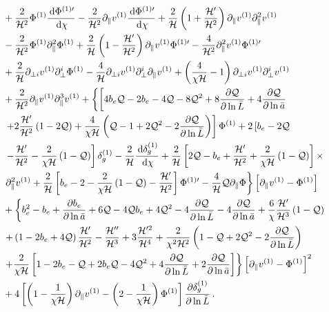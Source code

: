 \begin{align}
& + \frac{2}{\mathcal{H}^2} \Phi^{(1)} \frac{\,\mathrm{d} \Phi^{{(1)}\prime} }{\,\mathrm{d} \chi} - \frac{2}{\mathcal{H}^2} \partial_\| v^{(1)} \frac{\,\mathrm{d} \Phi^{{(1)} \prime} }{\,\mathrm{d} \chi} + \frac{2}{\mathcal{H}} \left(1 +\frac{\mathcal{H}'}{\mathcal{H}^2} \right) \partial_\| v^{(1)} \partial_\|^2 v^{(1)} \nonumber \\
& - \frac{2}{\mathcal{H}^2} \Phi^{(1)} \partial_\|^2 \Phi^{(1)} +\frac{2}{\mathcal{H}} \left(1 - \frac{\mathcal{H}'}{\mathcal{H}^2} \right) \partial_\| v^{(1)}\Phi^{(1)\prime} - \frac{4}{\mathcal{H}^2} \partial_\|^2 v^{(1)} \Phi^{(1)\prime} \nonumber \\
& + \frac{2}{\mathcal{H}} \partial_{\perp i} v^{(1)} \partial^i_\perp \Phi^{(1)} -\frac{{4}}{\mathcal{H}} \partial_{\perp i} v^{(1)} \partial_{\perp}^i \partial_\| v^{(1)} + \left(\frac{4}{ \chi \mathcal{H} } -1 \right) \partial_{\perp i} v^{(1)} \partial_{\perp}^i v^{(1)} \nonumber \\
& + \frac{2}{\mathcal{H}^2} \partial_\| v^{(1)} \partial_\|^3 v^{(1)} + \left\{ \left[ 4 b_e \mathcal{Q} - 2 b_e - 4 \mathcal{Q} - 8 \mathcal{Q}^2 + 8 \frac{\partial \mathcal{Q}}{\partial \ln \bar L} + 4 \frac{\partial \mathcal{Q}}{\partial \ln \bar a} \right. \right. \nonumber \\
&\left. \left. + 2  \frac{\mathcal{H}'}{\mathcal{H}^2} \left(1 - {2\mathcal{Q}}\right)  + \frac{4}{\chi \mathcal{H}} \left(\mathcal{Q} - 1 + 2 \mathcal{Q}^2 - 2 \frac{\partial \mathcal{Q}}{\partial \ln \bar L} \right) \right] \Phi^{(1)} + 2 \left[ b_e - 2\mathcal{Q} \right. \right. \nonumber \\
& \left. \left. -  \frac{\mathcal{H}'}{\mathcal{H}^2}  - \frac{2}{\chi \mathcal{H}} \left(1 - \mathcal{Q}\right)  \right] \delta_g^{(1)} - \frac{2}{\mathcal{H}} \frac{\,\mathrm{d} \delta_g^{(1)} }{\,\mathrm{d} \chi} + \frac{2}{\mathcal{H}} \left[ 2 \mathcal{Q} - b_e + \frac{\mathcal{H}'}{\mathcal{H}^2} + \frac{2}{\chi \mathcal{H}} \left(1 - \mathcal{Q}\right) \right]\times \right. \nonumber \\
&\left. \partial_\|^2 v^{(1)} + \frac{2}{\mathcal{H}} \left[ b_e - 2 - \frac{2}{\chi \mathcal{H}} \left(1 - \mathcal{Q} \right) - \frac{\mathcal{H}'}{\mathcal{H}^2} \right]  \Phi^{(1)\prime} - \frac{4}{\mathcal{H}} \mathcal{Q} \partial_\| \Phi \right\} \left[\partial_\| v^{(1)}- \Phi^{(1)} \right] \nonumber \\
& + \left\{ b_e^2 - b_e + \frac{\partial b_e}{\partial \ln \bar a} +6 \mathcal{Q} -4 \mathcal{Q} b_e + 4 \mathcal{Q}^2 - 4\frac{\partial \mathcal{Q}}{\partial \ln \bar L} - 4 \frac{\partial \mathcal{Q}}{\partial \ln \bar a} + \frac{6}{\chi} \frac{\mathcal{H}'}{\mathcal{H}^3} \left(1 - \mathcal{Q}\right) \right. \nonumber \\
& \left. + \left(1 - 2 b_e + 4\mathcal{Q} \right) \frac{\mathcal{H}' }{\mathcal{H}^2}  -\frac{\mathcal{H}'' }{\mathcal{H}^3} +3 \frac{\mathcal{H}^{\prime 2} }{\mathcal{H}^4} +  \frac{2}{\chi^2 \mathcal{H}^2} \left( 1 - \mathcal{Q} + 2 \mathcal{Q}^2 - 2 \frac{\partial \mathcal{Q}}{\partial \ln \bar L} \right) \right. \nonumber \\
& \left. + \frac{2}{\chi \mathcal{H}} \left[ 1 - 2 b_e - \mathcal{Q} + 2 b_e \mathcal{Q}  - 4 \mathcal{Q}^2 + 4 \frac{\partial \mathcal{Q}}{\partial \ln \bar L} + 2 \frac{\partial \mathcal{Q}}{\partial \ln \bar a} \right] \right\} \left[\partial_\| v^{(1)} - \Phi^{(1)}  \right]^2 \nonumber \\
&+ 4\left[ \left( 1 - \frac{1}{\chi \mathcal{H}} \right) \partial_\parallel v^{(1)} - \left(2 - \frac{1}{\chi \mathcal{H}} \right) \Phi^{(1)} \right] \frac{\partial \delta_g^{(1)}}{\partial \ln{\bar{L}}}\, .\label{eq:fulldeltaso}
\end{align}

